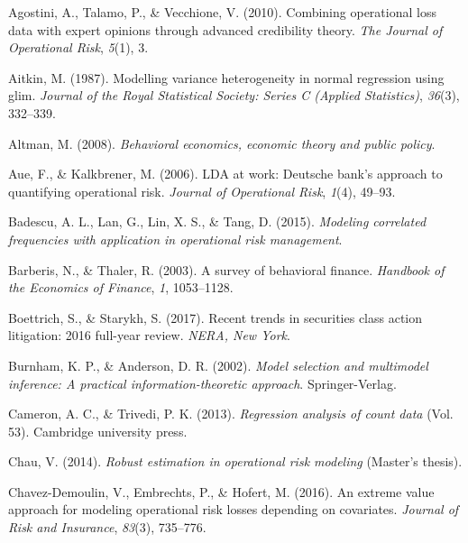\documentclass{DissertateUSU}
\begin{document}
\leavevmode\hypertarget{ref-agostini2010combining}{}%
Agostini, A., Talamo, P., \& Vecchione, V. (2010). Combining operational
loss data with expert opinions through advanced credibility theory.
\emph{The Journal of Operational Risk}, \emph{5}(1), 3.

\leavevmode\hypertarget{ref-aitkin1987modelling}{}%
Aitkin, M. (1987). Modelling variance heterogeneity in normal regression
using glim. \emph{Journal of the Royal Statistical Society: Series C
(Applied Statistics)}, \emph{36}(3), 332--339.

\leavevmode\hypertarget{ref-altman2008behavioral}{}%
Altman, M. (2008). \emph{Behavioral economics, economic theory and
public policy}.

\leavevmode\hypertarget{ref-aue2006lda}{}%
Aue, F., \& Kalkbrener, M. (2006). LDA at work: Deutsche bank's approach
to quantifying operational risk. \emph{Journal of Operational Risk},
\emph{1}(4), 49--93.

\leavevmode\hypertarget{ref-badescu2015modeling}{}%
Badescu, A. L., Lan, G., Lin, X. S., \& Tang, D. (2015). \emph{Modeling
correlated frequencies with application in operational risk management}.

\leavevmode\hypertarget{ref-barberis2003survey}{}%
Barberis, N., \& Thaler, R. (2003). A survey of behavioral finance.
\emph{Handbook of the Economics of Finance}, \emph{1}, 1053--1128.

\leavevmode\hypertarget{ref-boettrich2017recent}{}%
Boettrich, S., \& Starykh, S. (2017). Recent trends in securities class
action litigation: 2016 full-year review. \emph{NERA, New York}.

\leavevmode\hypertarget{ref-Burnham2002}{}%
Burnham, K. P., \& Anderson, D. R. (2002). \emph{Model selection and
multimodel inference: A practical information-theoretic approach}.
Springer-Verlag.

\leavevmode\hypertarget{ref-cameron2013regression}{}%
Cameron, A. C., \& Trivedi, P. K. (2013). \emph{Regression analysis of
count data} (Vol. 53). Cambridge university press.

\leavevmode\hypertarget{ref-chau2014robust}{}%
Chau, V. (2014). \emph{Robust estimation in operational risk modeling}
(Master's thesis).

\leavevmode\hypertarget{ref-chavez2016extreme}{}%
Chavez-Demoulin, V., Embrechts, P., \& Hofert, M. (2016). An extreme
value approach for modeling operational risk losses depending on
covariates. \emph{Journal of Risk and Insurance}, \emph{83}(3),
735--776.
\end{document}
